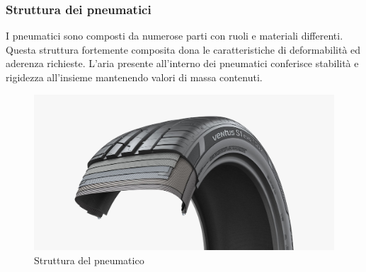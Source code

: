 \subsubsection{Struttura dei pneumatici }
I pneumatici sono composti da numerose parti con ruoli e materiali differenti.
Questa struttura fortemente composita dona le caratteristiche di deformabilità ed aderenza richieste.
L'aria presente all'interno dei pneumatici conferisce stabilità e rigidezza all'insieme mantenendo valori di massa contenuti.
\begin{figure}[ht]
    \centering
    \includegraphics[scale=0.15]{Immagini/Tyres/Tire Structure_w.jpg}
    \caption{Struttura del pneumatico}
    \label{fig:Structure_tyres}
\end{figure}

